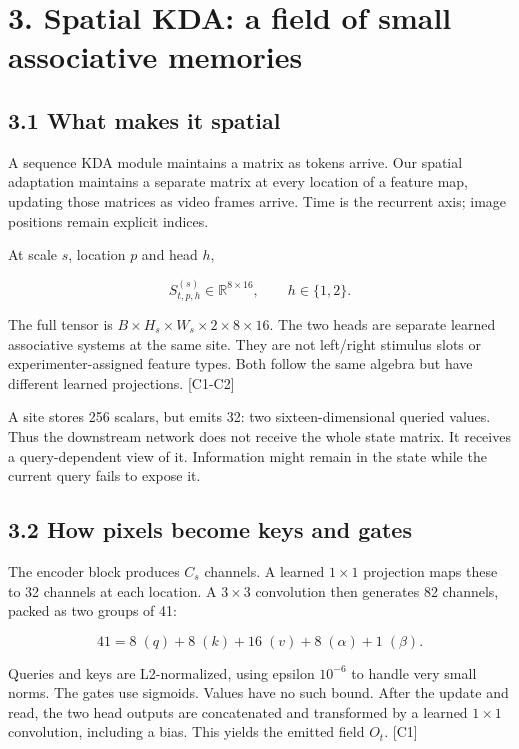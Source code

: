 \documentclass[
  11pt,
]{article}
\let\oldsubsection\subsection
\renewcommand{\subsection}{\Needspace{6\baselineskip}\oldsubsection}
\begin{document}
\newpage

\section{3. Spatial KDA: a field of small associative
memories}\label{spatial-kda-a-field-of-small-associative-memories}

\subsection{3.1 What makes it spatial}\label{what-makes-it-spatial}

A sequence KDA module maintains a matrix as tokens arrive. Our spatial
adaptation maintains a separate matrix at every location of a feature
map, updating those matrices as video frames arrive. Time is the
recurrent axis; image positions remain explicit indices.

At scale \(s\), location \(p\) and head \(h\),

\[S^{(s)}_{t,p,h}\in\mathbb R^{8\times16},\qquad h\in\{1,2\}.\]

The full tensor is \(B\times H_s\times W_s\times2\times8\times16\). The
two heads are separate learned associative systems at the same site.
They are not left/right stimulus slots or experimenter-assigned feature
types. Both follow the same algebra but have different learned
projections. {[}C1-C2{]}

A site stores 256 scalars, but emits 32: two sixteen-dimensional queried
values. Thus the downstream network does not receive the whole state
matrix. It receives a query-dependent view of it. Information might
remain in the state while the current query fails to expose it.

\subsection{3.2 How pixels become keys and
gates}\label{how-pixels-become-keys-and-gates}

The encoder block produces \(C_s\) channels. A learned \(1\times1\)
projection maps these to 32 channels at each location. A \(3\times3\)
convolution then generates 82 channels, packed as two groups of 41:

\[41=8\;(q)+8\;(k)+16\;(v)+8\;(\alpha)+1\;(\beta).\]

Queries and keys are L2-normalized, using epsilon \(10^{-6}\) to handle
very small norms. The gates use sigmoids. Values have no such bound.
After the update and read, the two head outputs are concatenated and
transformed by a learned \(1\times1\) convolution, including a bias.
This yields the emitted field \(O_t\). {[}C1{]}
\end{document}
